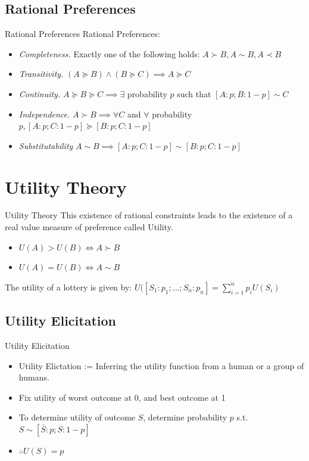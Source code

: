 \documentclass{beamer}
\begin{document}
\subsection{Rational Preferences}
\begin{frame}{Rational Preferences}
Rational Preferences:
\begin{itemize}
    \item \textit{Completeness.} Exactly one of the following holds: $A \succ B, A \sim B, A \prec B$
    \item \textit{Transitivity.} $(A \succeq B) \land (B \succeq C) \implies A \succeq C$
    \item \textit{Continuity.} $A \succeq B \succeq C \implies \exists$ probability $p$ such that $[A: p; B: 1-p] \sim C$
    \item \textit{Independence.} $A \succ B \implies \forall C$ and $\forall$ probability $p, [A:p;C:1-p] \succeq [B:p;C:1-p]$
    \item \textit{Substitutability} $A \sim B \implies [A:p;C:1-p] \sim [B:p; C:1-p]$
\end{itemize}
\end{frame}


\section{Utility Theory}
\begin{frame}{Utility Theory}
This existence of rational constraints leads to the existence of a real value measure of preference called Utility. 
\begin{itemize}
    \item $U(A) > U(B) \iff A \succ B$
    \item $U(A) = U(B) \iff A \sim B$
\end{itemize}
The utility of a lottery is given by:
$U([S_1:p_1; ... ; S_n:p_n] = \sum_{i=1}^{n} p_{i}U(S_i)$
\end{frame}

\subsection{Utility Elicitation}
\begin{frame}{Utility Elicitation}
\begin{itemize}
    \item Utility Elictation := Inferring the utility function from a human or a group of humans. 
    \item Fix utility of worst outcome at 0, and best outcome at 1
    \item To determine utility of outcome $S$, determine probability $p$ s.t. $S \sim [\bar{S}:p;S:1-p]$
    \item $\therefore U(S) = p$
\end{itemize}
\end{frame}
\end{document}
